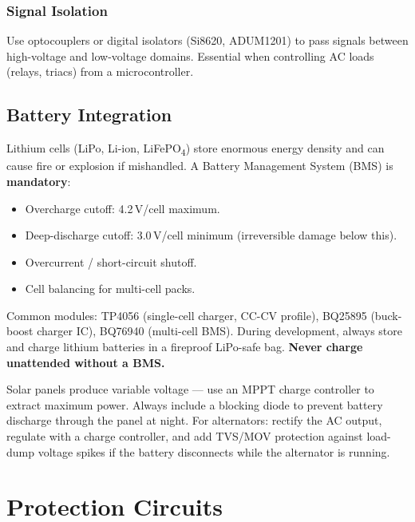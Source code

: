 \documentclass[11pt,letterpaper,twoside,openany]{book}
\begin{document}
\subsubsection{Signal Isolation}
Use optocouplers or digital isolators (Si8620, ADUM1201) to pass signals between high-voltage and low-voltage domains. Essential when controlling AC loads (relays, triacs) from a microcontroller.


\subsection{Battery Integration}
\label{sec:battery}

Lithium cells (LiPo, Li-ion, LiFePO\textsubscript{4}) store enormous energy density and can cause fire or explosion if mishandled. A Battery Management System (BMS) is \textbf{mandatory}:

\begin{itemize}[nosep,leftmargin=1.5em]
  \item Overcharge cutoff: 4.2\,V/cell maximum.
  \item Deep-discharge cutoff: 3.0\,V/cell minimum (irreversible damage below this).
  \item Overcurrent / short-circuit shutoff.
  \item Cell balancing for multi-cell packs.
\end{itemize}

Common modules: TP4056 (single-cell charger, CC-CV profile), BQ25895 (buck-boost charger IC), BQ76940 (multi-cell BMS). During development, always store and charge lithium batteries in a fireproof LiPo-safe bag. \textbf{Never charge unattended without a BMS.}

\begin{tipbox}
Solar panels produce variable voltage --- use an MPPT charge controller to extract maximum power. Always include a blocking diode to prevent battery discharge through the panel at night. For alternators: rectify the AC output, regulate with a charge controller, and add TVS/MOV protection against load-dump voltage spikes if the battery disconnects while the alternator is running.
\end{tipbox}


\FloatBarrier
\section{Protection Circuits}
\label{sec:protection}
\end{document}
